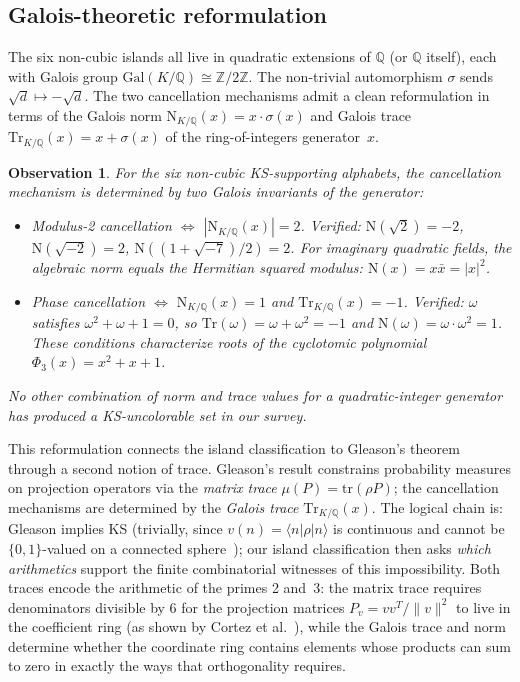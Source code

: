 \documentclass[12pt,a4paper]{article}
\newtheorem{observation}[theorem]{Observation}
\newcommand{\Z}{\mathbb{Z}}
\newcommand{\Q}{\mathbb{Q}}
\begin{document}
\subsection{Galois-theoretic reformulation}\label{sec:galois}

The six non-cubic islands all live in quadratic extensions of $\Q$ (or $\Q$ itself), each with Galois group $\mathrm{Gal}(K/\Q) \cong \Z/2\Z$.  The non-trivial automorphism $\sigma$ sends $\sqrt{d} \mapsto -\sqrt{d}$.  The two cancellation mechanisms admit a clean reformulation in terms of the Galois norm $\mathrm{N}_{K/\Q}(x) = x \cdot \sigma(x)$ and Galois trace $\mathrm{Tr}_{K/\Q}(x) = x + \sigma(x)$ of the ring-of-integers generator~$x$.

\begin{observation}\label{obs:galois-norm-trace}
For the six non-cubic KS-supporting alphabets, the cancellation mechanism is determined by two Galois invariants of the generator:
\begin{itemize}
    \item \emph{Modulus-2 cancellation} $\Leftrightarrow$ $|\mathrm{N}_{K/\Q}(x)| = 2$.  Verified: $\mathrm{N}(\sqrt{2}) = -2$, $\mathrm{N}(\sqrt{-2}) = 2$, $\mathrm{N}((1+\sqrt{-7})/2) = 2$.  For imaginary quadratic fields, the algebraic norm equals the Hermitian squared modulus: $\mathrm{N}(x) = x \bar{x} = |x|^2$.
    \item \emph{Phase cancellation} $\Leftrightarrow$ $\mathrm{N}_{K/\Q}(x) = 1$ and $\mathrm{Tr}_{K/\Q}(x) = -1$.  Verified: $\omega$ satisfies $\omega^2 + \omega + 1 = 0$, so $\mathrm{Tr}(\omega) = \omega + \omega^2 = -1$ and $\mathrm{N}(\omega) = \omega \cdot \omega^2 = 1$.  These conditions characterize roots of the cyclotomic polynomial $\Phi_3(x) = x^2 + x + 1$.
\end{itemize}
No other combination of norm and trace values for a quadratic-integer generator has produced a KS-uncolorable set in our survey.
\end{observation}

This reformulation connects the island classification to Gleason's theorem through a second notion of trace.  Gleason's result constrains probability measures on projection operators via the \emph{matrix trace} $\mu(P) = \mathrm{tr}(\rho P)$; the cancellation mechanisms are determined by the \emph{Galois trace} $\mathrm{Tr}_{K/\Q}(x)$.  The logical chain is: Gleason implies KS (trivially, since $v(n) = \langle n | \rho | n \rangle$ is continuous and cannot be $\{0,1\}$-valued on a connected sphere~\cite{RajanVisser2019}); our island classification then asks \emph{which arithmetics} support the finite combinatorial witnesses of this impossibility.  Both traces encode the arithmetic of the primes 2 and~3: the matrix trace requires denominators divisible by 6 for the projection matrices $P_v = vv^T/\|v\|^2$ to live in the coefficient ring (as shown by Cortez et al.~\cite{CortezMoralesReyes2022}), while the Galois trace and norm determine whether the coordinate ring contains elements whose products can sum to zero in exactly the ways that orthogonality requires.
\end{document}
